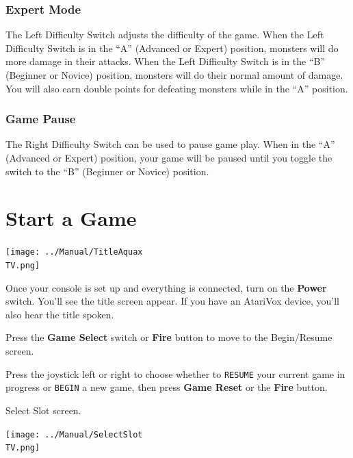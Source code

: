 \documentclass[10pt,twocolumn,openany,article]{memoir}
\newcommand\TV{NTSC}
\newcommand\TV{PAL}
\newcommand\TV{SECAM}
\begin{document}
\fi

\subsubsection*{Expert Mode}

The Left Difficulty Switch adjusts the  difficulty of the game. When the
Left Difficulty  Switch is in  the ``A'' (Advanced or  Expert) position,
monsters will do more damage in  their attacks. When the Left Difficulty
Switch is in  the ``B'' (Beginner or Novice) position,  monsters will do
their normal  amount of  damage. You  will also  earn double  points for
defeating monsters while in the ``A'' position.

\ifdefined\TVSECAM

\subsubsection*{Game Pause}

The Right Difficulty Switch  can be used to pause game  play. When in the
``A'' (Advanced or Expert) position, your  game will be paused until you
toggle the switch to the ``B'' (Beginner or Novice) position.

\fi

\section{Start a Game}

\begin{center}
  \texttt{[image: ../Manual/TitleAquax\\TV.png]}
\end{center}

Once your  console is set  up and everything  is connected, turn  on the
\textbf{Power} switch. You'll  see the title screen appear.  If you have
an AtariVox device, you'll also hear the title spoken.

Press the \textbf{Game Select} switch or \textbf{Fire} button to move to
the
\ifdefined\NOSAVE
Begin/Resume screen.

Press the  joystick left or  right to choose whether  to \texttt{RESUME}
your current game  in progress or \texttt{BEGIN} a new  game, then press
\textbf{Game Reset} or the \textbf{Fire} button.

\else
Select Slot screen.

\begin{center}
  \texttt{[image: ../Manual/SelectSlot\\TV.png]}
\end{center}
\end{document}
